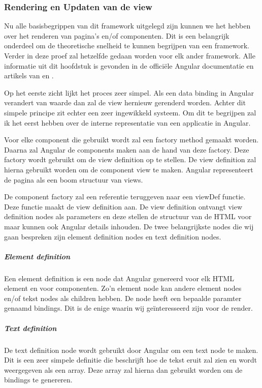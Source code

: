 \subsubsection{Rendering en Updaten van de view}
\label{sec:Angular_Rendering_Updaten}
Nu alle basisbegrippen van dit framework uitgelegd zijn kunnen we het hebben over het renderen van pagina’s en/of componenten. Dit is een belangrijk onderdeel om de theoretische snelheid te kunnen begrijpen van een framework. Verder in deze proef zal hetzelfde gedaan worden voor elk ander framework. Alle informatie uit dit hoofdstuk is gevonden in de officiële Angular documentatie \autocite{_angular_2018} en artikels van \textcite{precht_thoughtram_2016} en \textcite{koretskyi_angular_2017}.

Op het eerste zicht lijkt het proces zeer simpel. Als een data binding in Angular verandert van waarde dan zal de view hernieuw gerenderd worden. Achter dit simpele principe zit echter een zeer ingewikkeld systeem. Om dit te begrijpen zal ik het eerst hebben over de interne representatie van een applicatie in Angular.

Voor elke component die gebruikt wordt zal een factory method gemaakt worden. Daarna zal Angular de components maken aan de hand van deze factory. Deze factory wordt gebruikt om de view definition op te stellen. De view definition zal hierna gebruikt worden om de component view te maken. Angular representeert de pagina als een boom structuur van views.

De component factory zal een referentie teruggeven naar een viewDef functie. Deze functie maakt de view definition aan. De view definition ontvangt view definition nodes als parameters en deze stellen de structuur van de HTML voor maar kunnen ook Angular details inhouden. De twee belangrijkste nodes die wij gaan bespreken zijn element definition nodes en text definition nodes.

\subparagraph{Element definition}
Een element definition is een node dat Angular genereerd voor elk HTML element en voor componenten. Zo’n element node kan andere element nodes en/of tekst nodes als children hebben. De node heeft een bepaalde paramter genaamd bindings. Dit is de enige waarin wij geïnteresseerd zijn voor de render.

\subparagraph{Text definition}
De text definition node wordt gebruikt door Angular om een text node te maken. Dit is een zeer simpele definitie die beschrijft hoe de tekst eruit zal zien en wordt weergegeven als een array. Deze array zal hierna dan gebruikt worden om de bindings te genereren.

